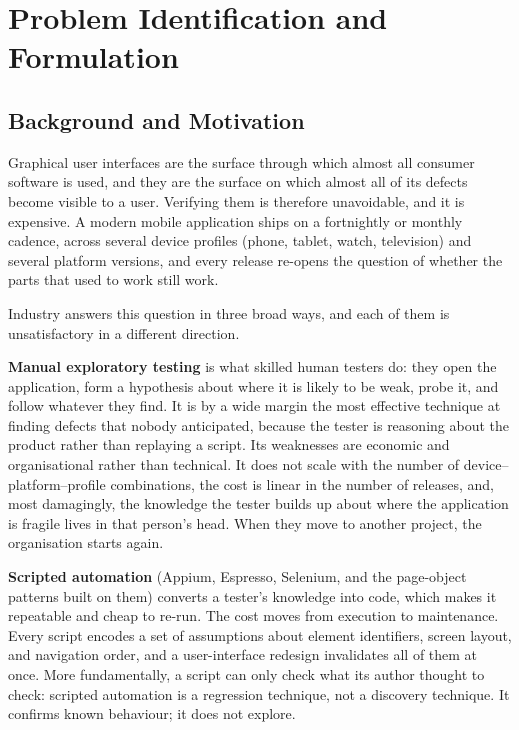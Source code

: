 \chapter{Problem Identification and Formulation}
\label{ch:problem}

\section{Background and Motivation}
\label{sec:background}

Graphical user interfaces are the surface through which almost all consumer
software is used, and they are the surface on which almost all of its defects
become visible to a user. Verifying them is therefore unavoidable, and it is
expensive. A modern mobile application ships on a fortnightly or monthly
cadence, across several device profiles (phone, tablet, watch, television) and
several platform versions, and every release re-opens the question of whether
the parts that used to work still work.

Industry answers this question in three broad ways, and each of them is
unsatisfactory in a different direction.

\textbf{Manual exploratory testing} is what skilled human testers do: they open
the application, form a hypothesis about where it is likely to be weak, probe
it, and follow whatever they find. It is by a wide margin the most effective
technique at finding defects that nobody anticipated, because the tester is
reasoning about the product rather than replaying a script. Its weaknesses are
economic and organisational rather than technical. It does not scale with the
number of device--platform--profile combinations, the cost is linear in the
number of releases, and, most damagingly, the knowledge the tester builds up
about where the application is fragile lives in that person's head. When they
move to another project, the organisation starts again.

\textbf{Scripted automation} (Appium, Espresso, Selenium, and the page-object
patterns built on them) converts a tester's knowledge into code, which makes it
repeatable and cheap to re-run. The cost moves from execution to maintenance.
Every script encodes a set of assumptions about element identifiers, screen
layout, and navigation order, and a user-interface redesign invalidates all of
them at once. More fundamentally, a script can only check what its author
thought to check: scripted automation is a regression technique, not a
discovery technique. It confirms known behaviour; it does not explore.

